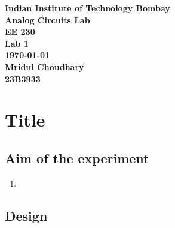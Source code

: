 \documentclass[12pt]{article}
\begin{document}


\begin{titlepage}
    \begin{center}
        \vspace*{2cm}


        {\huge\textbf{Indian Institute of Technology Bombay}} \\[1cm]

        {\huge\textbf{Analog Circuits Lab \\[0.2cm] EE 230}} \\[2cm]
        
        {\Large\textbf{Lab 1 \\[0.2cm] \today }}\\ [2cm]
        
        {\Large\textbf{Mridul Choudhary \\ 23B3933 }}
            
    \end{center}
\end{titlepage}


\newpage
\tableofcontents


\newpage
\section{Title}
\subsection{Aim of the experiment}


\begin{enumerate}
\item 
\end{enumerate}


\subsection{Design}

\hspace*{1cm}  

\begin{equation}
\end{equation}     
\end{document}
